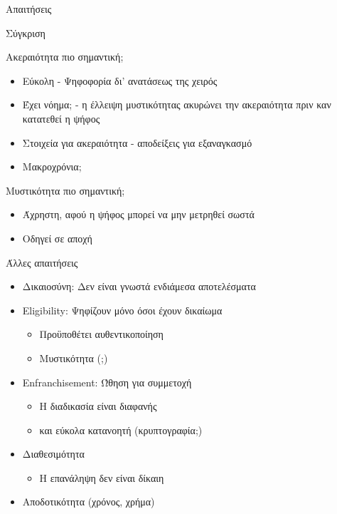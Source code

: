 \documentclass[handout]{beamer}
\begin{document}
\begin{section}{Απαιτήσεις}
\begin{frame}{Σύγκριση}
\begin{block}{Ακεραιότητα πιο σημαντική;}
\begin{itemize}
\item Εύκολη - Ψηφοφορία δι' ανατάσεως της χειρός
\item Έχει νόημα; - η έλλειψη μυστικότητας ακυρώνει την ακεραιότητα πριν καν κατατεθεί η ψήφος
\item Στοιχεία για ακεραιότητα - αποδείξεις για εξαναγκασμό
\item Μακροχρόνια;
\end{itemize}
\end{block}
\pause
\begin{block}{Μυστικότητα πιο σημαντική;}
\begin{itemize}
\item Άχρηστη, αφού η ψήφος μπορεί να μην μετρηθεί σωστά
\item Οδηγεί σε αποχή
\end{itemize}
\end{block}
\end{frame}

\begin{frame}{Άλλες απαιτήσεις}
\begin{itemize}
    \item Δικαιοσύνη: Δεν είναι γνωστά ενδιάμεσα αποτελέσματα \pause
    \item Eligibility: Ψηφίζουν μόνο όσοι έχουν δικαίωμα
    \begin{itemize}
        \item Προϋποθέτει αυθεντικοποίηση
        \item Μυστικότητα (;)
    \end{itemize}  \pause
    \item Enfranchisement: Ώθηση για συμμετοχή 
    \begin{itemize}
        \item Η διαδικασία είναι διαφανής
        \item και εύκολα κατανοητή (κρυπτογραφία;)
    \end{itemize}  \pause
    \item Διαθεσιμότητα  
    \begin{itemize}
        \item Η επανάληψη δεν είναι δίκαιη
    \end{itemize} \pause
    \item Αποδοτικότητα (χρόνος, χρήμα)
\end{itemize}
\end{frame}
\end{section} 
\end{document}
